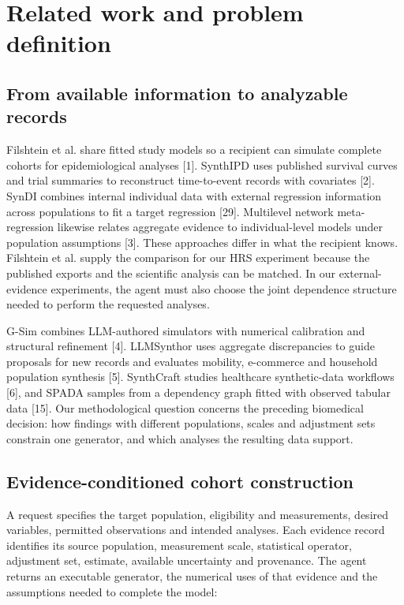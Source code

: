 \documentclass[sigconf,anonymous,review]{acmart}
\begin{document}
\section{Related work and problem definition}

\subsection{From available information to analyzable records}

Filshtein et al. share fitted study models so a recipient can simulate complete cohorts for epidemiological analyses [1]. SynthIPD uses published survival curves and trial summaries to reconstruct time-to-event records with covariates [2]. SynDI combines internal individual data with external regression information across populations to fit a target regression [29]. Multilevel network meta-regression likewise relates aggregate evidence to individual-level models under population assumptions [3]. These approaches differ in what the recipient knows. Filshtein et al. supply the comparison for our HRS experiment because the published exports and the scientific analysis can be matched. In our external-evidence experiments, the agent must also choose the joint dependence structure needed to perform the requested analyses.


G-Sim combines LLM-authored simulators with numerical calibration and structural refinement [4]. LLMSynthor uses aggregate discrepancies to guide proposals for new records and evaluates mobility, e-commerce and household population synthesis [5]. SynthCraft studies healthcare synthetic-data workflows [6], and SPADA samples from a dependency graph fitted with observed tabular data [15]. Our methodological question concerns the preceding biomedical decision: how findings with different populations, scales and adjustment sets constrain one generator, and which analyses the resulting data support.


\subsection{Evidence-conditioned cohort construction}

A request specifies the target population, eligibility and measurements, desired variables, permitted observations and intended analyses. Each evidence record identifies its source population, measurement scale, statistical operator, adjustment set, estimate, available uncertainty and provenance. The agent returns an executable generator, the numerical uses of that evidence and the assumptions needed to complete the model:
\end{document}
